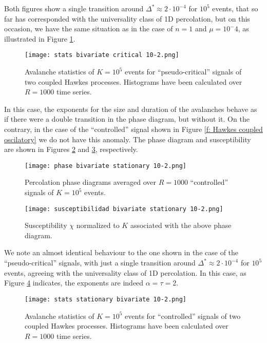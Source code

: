 Both figures show a single transition around $\Delta^*\approx 2\cdot 10^{-4}$ for $10^5$ events, that so far has corresponded with the universality class of 1D percolation, but on this occasion, we have the same 
situation as in the case of $n=1$ and $\mu=10^-4$, as illustrated in Figure \ref{f: stats pseudocritical}.

\begin{figure}[H]
    \centering
    \texttt{[image: stats bivariate critical 10-2.png]}
    \caption{Avalanche statistics of $K=10^5$ events for ``pseudo-critical'' signals of two coupled Hawkes processes. Histograms have been calculated over $R=1000$ time series.}
    \label{f: stats pseudocritical}
\end{figure}

In this case, the exponents for the size and duration of the avalanches behave as if there were a double transition in the phase diagram, but without it. On the contrary, in the case of 
the ``controlled'' signal shown in Figure \ref{f: Hawkes coupled oscilatory} we do not have this anomaly. The phase diagram and susceptibility are shown in Figures 
\ref{f:phase_diagram_coupled oscilatory} and \ref{f:susceptibilidad_coupled oscilatory}, respectively.

\begin{figure}[H]
    \centering
    \texttt{[image: phase bivariate stationary 10-2.png]}
    \caption{Percolation phase diagrams averaged over $R=1000$ ``controlled'' signals of $K=10^5$ events.}
    \label{f:phase_diagram_coupled oscilatory}
\end{figure}

\begin{figure}[H]
    \centering
    \texttt{[image: susceptibilidad bivariate stationary 10-2.png]}
    \caption{Susceptibility $\chi$ normalized to $K$ associated with the above phase diagram.}
    \label{f:susceptibilidad_coupled oscilatory}
\end{figure}

We note an almost identical behaviour to the one shown in the case of the ``pseudo-critical'' signals, with just a single transition around $\Delta^*\approx 2\cdot 10^{-4}$ for $10^5$ events, 
agreeing with the universality class of 1D percolation. In this case, as Figure \ref{f: stats oscilatory} 
indicates, the exponents are indeed $\alpha=\tau=2$.

\begin{figure}[H]
    \centering
    \texttt{[image: stats stationary bivariate 10-2.png]}
    \caption{Avalanche statistics of $K=10^5$ events for ``controlled'' signals of two coupled Hawkes processes. Histograms have been calculated over $R=1000$ time series.}
    \label{f: stats oscilatory}
\end{figure}

